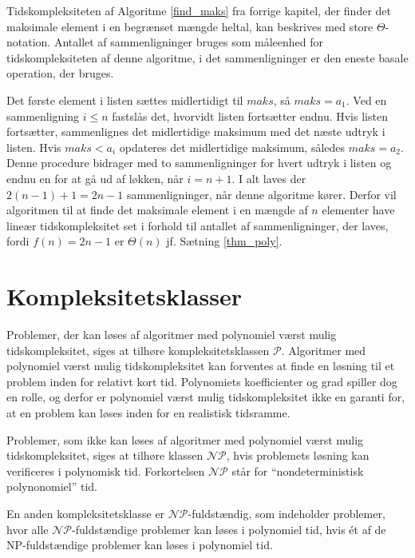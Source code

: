 \begin{exmp}
Tidskompleksiteten af Algoritme \ref{find_maks} fra forrige kapitel, der finder det maksimale element i en begrænset mængde heltal, kan beskrives med store $\Theta$-notation. 
Antallet af sammenligninger bruges som måleenhed for tidskompleksiteten af denne algoritme, i det sammenligninger er den eneste basale operation, der bruges.

Det første element i listen sættes midlertidigt til $maks$, så $maks=a_1$. 
Ved en sammenligning $i \leq n$ fastslås det, hvorvidt listen fortsætter endnu. Hvis listen fortsætter, sammenlignes det midlertidige maksimum med det næste udtryk i listen. 
Hvis $maks<a_i$ opdateres det midlertidige maksimum, således $maks=a_2$.
Denne procedure bidrager med to sammenligninger for hvert udtryk i listen og endnu en for at gå ud af løkken, når $i=n+1$. 
I alt laves der $2(n-1)+1=2n-1$ sammenligninger, når denne algoritme kører. 
Derfor vil algoritmen til at finde det maksimale element i en mængde af $n$ elementer have lineær tidskompleksitet set i forhold til antallet af sammenligninger, der laves, fordi $f(n)=2n-1$ er $\Theta (n)$ jf. Sætning \ref{thm_poly}. 
\label{eks_lin_soeg} 
\end{exmp}

\section{Kompleksitetsklasser}
Problemer, der kan løses af algoritmer med polynomiel værst mulig tidskompleksitet, siges at tilhøre kompleksitetsklassen $\mathcal{P}$. 
Algoritmer med polynomiel værst mulig tidskompleksitet kan forventes at finde en løsning til et problem inden for relativt kort tid. 
Polynomiets koefficienter og grad spiller dog en rolle, og derfor er polynomiel værst mulig tidskompleksitet ikke en garanti for, at en problem kan løses inden for en realistisk tidsramme.

Problemer, som ikke kan løses af algoritmer med  polynomiel værst mulig tidskompleksitet, siges at tilhøre klassen $\mathcal{NP}$, hvis problemets løsning kan verificeres i polynomisk tid. Forkortelsen $\mathcal{NP}$ står for “nondeterministisk polynonomiel” tid. 

En anden kompleksitetsklasse er $\mathcal{NP}$-fuldstændig, som indeholder problemer, hvor alle $\mathcal{NP}$-fuldstændige problemer kan løses i polynomiel tid, hvis ét af de NP-fuldstændige problemer kan løses i polynomiel tid.


